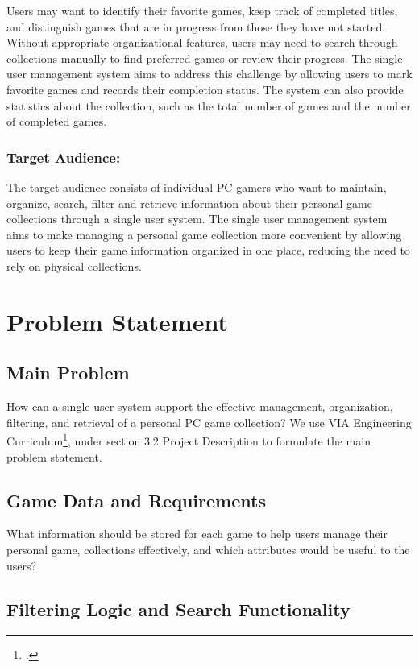 \documentclass[11pt]{article}
\begin{document}
Users may want to identify their favorite games, keep track of completed titles, and distinguish games that are in progress from those they have not started. Without appropriate organizational features, users may need to search through collections manually to find preferred games or review their progress. The single user management system aims to address this challenge by allowing users to mark favorite games and records their completion status. The system can also provide statistics about the collection, such as the total number of games and the number of completed games.


\subsubsection{Target Audience:}

The target audience consists of individual PC gamers who want to maintain, organize, search, filter and retrieve information about their personal game collections through a single user system. The single user management system aims to make managing a personal game collection more convenient by allowing users to keep their game information organized in one place, reducing the need to rely on physical collections.

\newpage
\section{Problem Statement}

\subsection*{Main Problem}
How can a single-user system support the effective management, organization, filtering, and retrieval of a personal PC game collection? We use VIA Engineering Curriculum\footcite{via_engineering_guidelines_2020}, under section 3.2 Project Description to formulate the main problem statement.


\subsection{Game Data and Requirements}

What information should be stored for each game to help users manage their personal game, collections effectively, and which attributes would be useful to the users?

\subsection{Filtering Logic and Search Functionality}
\end{document}
